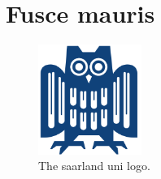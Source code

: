 \section{Fusce mauris}

\lipsum[11-13]

\begin{figure}[H]
\centering
\includegraphics[width=0.3\textwidth]{eule.png}
\caption{The saarland uni logo.}
\label{fig:logo}
\end{figure}

\lipsum[14-15]